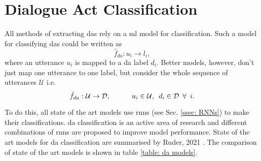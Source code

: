 
\section{Dialogue Act Classification \label{ssec: da classification}}
    All methods of extracting \glspl{da} rely on a \gls{ml} \gls{model} for classification. Such a \gls{model} for classifying \glspl{da} could be written as
    \begin{equation}
        \hat{f}_{da}: u_i \rightarrow l_i,
    \end{equation}
    where an \gls{utterance} $u_i$ is mapped to a \gls{da} label $d_i$. Better \glspl{model}, however, don't just map one \gls{utterance} to one label, but consider the whole sequence of \glspl{utterance} $\mathcal{U}$ i.e.
    \begin{equation}
        \hat{f}_{da}: \mathcal{U} \rightarrow \mathcal{D}, \hspace{3em} u_i \in \mathcal{U}, \hspace{0.5em} d_i \in \mathcal{D} \hspace{0.5em} \forall \hspace{0.5em} i.
    \end{equation}

    To do this, all state of the art \glspl{model} use \glspl{rnn} (see Sec. \ref{ssec: RNNs}) to make their classifications. \Gls{da} classification is an active area of research and different combinations of \glspl{rnn} are proposed to improve \gls{model} performance. State of the art \glspl{model} for \gls{da} classification are summarised by Ruder, 2021 \cite{DAgithub}. The comparison of state of the art \glspl{model} is shown in table \ref{table: da models}.

